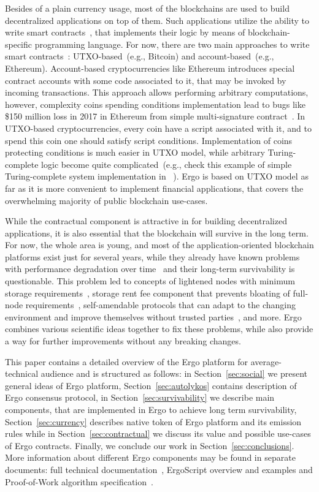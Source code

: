 Besides of a plain currency usage, most of the blockchains are used to build decentralized applications on top of them.
Such applications utilize the ability to write smart contracts~\cite{szabo1994smart}, that implements their logic
by means of blockchain-specific programming language.
For now, there are two main approaches to write smart contracts~\cite{zahnentferner2018chimeric}:
UTXO-based~(e.g., Bitcoin) and account-based~(e.g., Ethereum).
Account-based cryptocurrencies like Ethereum introduces special contract accounts with some code associated to it,
that may be invoked by incoming transactions.
This approach allows performing arbitrary computations, however, complexity coins spending conditions
implementation lead to bugs like \$150 million loss in 2017 in Ethereum from simple multi-signature contract~\cite{parityLock}.
In UTXO-based cryptocurrencies, every coin have a script associated with it, and to spend this coin one should
satisfy script conditions.
Implementation of coins protecting conditions is much easier in UTXO model,
while arbitrary Turing-complete logic become quite complicated~(e.g., check this example of
simple Turing-complete system implementation in \Ergo{}~\cite{chepurnoy2018self}).
Ergo is based on UTXO model as far as it is more convenient to implement financial applications, that
covers the overwhelming majority of public blockchain use-cases.

While the contractual component is attractive in for building decentralized applications,
it is also essential that the blockchain will survive in the long term.
For now, the whole area is young, and most of the application-oriented blockchain platforms exist just for several years,
while they already have known problems with performance degradation over time~\cite{???} and their long-term survivability is questionable.
This problem led to concepts of lightened nodes with minimum storage requirements~\cite{reyzin2017improving},
storage rent fee component that prevents bloating of full-node requirements~\cite{chepurnoy2018systematic},
self-amendable protocols that can adapt to the changing environment and improve themselves without
trusted parties~\cite{goodman2014tezos}, and more.
Ergo combines various scientific ideas together to fix these problems, while also provide a way for
further improvements without any breaking changes.

This paper contains a detailed overview of the Ergo platform for average-technical audience
and is structured as follows: in Section~\ref{sec:social} we present general ideas of Ergo platform,
Section~\ref{sec:autolykos} contains description of Ergo consensus protocol,
in Section~\ref{sec:survivability} we describe main components, that are implemented in Ergo
to achieve long term survivability, Section~\ref{sec:currency} describes native token
of Ergo platform and its emission rules while in Section~\ref{sec:contractual} we
discuss its value and possible use-cases of Ergo contracts.
Finally, we conclude our work in Section~\ref{sec:conclusions}.
More information about different Ergo components may be found in separate documents:
full technical documentation~\cite{yellowpaper}, ErgoScript overview and examples\cite{???,???} and
Proof-of-Work algorithm specification~\cite{Ergopow}.
